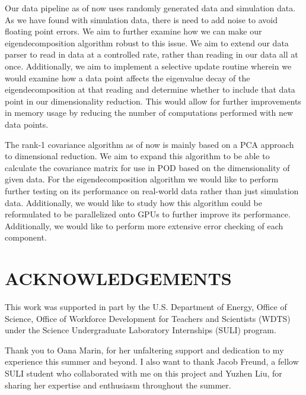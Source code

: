 \documentclass[onecolumn]{webofc}
\begin{document}
Our data pipeline as of now uses randomly generated data and simulation data. As we have found with simulation data, there is need to add noise to avoid floating point errors. We aim to further examine how we can make our eigendecomposition algorithm robust to this issue. We aim to extend our data parser to read in data at a controlled rate, rather than reading in our data all at once. Additionally, we aim to implement a selective update routine wherein we would examine how a data point affects the eigenvalue decay of the eigendecomposition at that reading and determine whether to include that data point in our dimensionality reduction. This would allow for further improvements in memory usage by reducing the number of computations performed with new data points.

The rank-1 covariance algorithm as of now is mainly based on a PCA approach to dimensional reduction. We aim to expand this algorithm to be able to calculate the covariance matrix for use in POD based on the dimensionality of given data. For the eigendecomposition algorithm we would like to perform further testing on its performance on real-world data rather than just simulation data. Additionally, we would like to study how this algorithm could be reformulated to be parallelized onto GPUs to further improve its performance. Additionally, we would like to perform more extensive error checking of each component.

\section{ACKNOWLEDGEMENTS}
\label{ack}
This work was supported in part by the U.S. Department of Energy, Office of Science, Office of Workforce Development for Teachers and Scientists (WDTS) under the Science Undergraduate Laboratory Internships (SULI) program. 

Thank you to Oana Marin, for her unfaltering support and dedication to my experience this summer and beyond.  I also want to thank Jacob Freund, a fellow SULI student who collaborated with me on this project and Yuzhen Liu, for sharing her expertise and enthusiasm throughout the summer.

\end{document}
